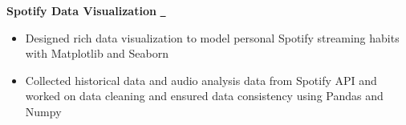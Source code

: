 \textbf{Spotify Data Visualization} \href{https://ininicho.com/stories/spotify-unwrapped}{\github\ } \par
\begin{itemize}
	\item Designed rich data visualization to model personal Spotify streaming habits with Matplotlib and Seaborn
    \item Collected historical data and audio analysis data from Spotify API and worked on data cleaning and ensured data consistency using Pandas and Numpy
\end{itemize}
\vspace{0.1cm} \par
